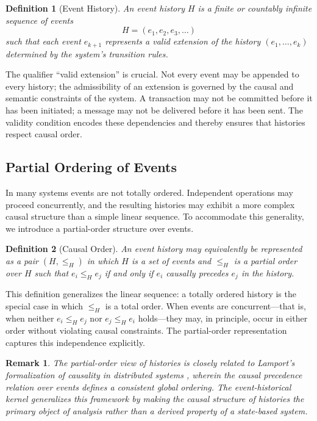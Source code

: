 \documentclass[12pt]{article}
\newtheorem{definition}{Definition}
\newtheorem{remark}{Remark}
\begin{document}
\begin{definition}[Event History]
An \emph{event history} $H$ is a finite or countably infinite sequence of events
\[
H = (e_1, e_2, e_3, \ldots)
\]
such that each event $e_{k+1}$ represents a valid extension of the history $(e_1, \ldots, e_k)$ determined by the system's transition rules.
\end{definition}

The qualifier ``valid extension'' is crucial. Not every event may be appended to every history; the admissibility of an extension is governed by the causal and semantic constraints of the system. A transaction may not be committed before it has been initiated; a message may not be delivered before it has been sent. The validity condition encodes these dependencies and thereby ensures that histories respect causal order.

\subsection{Partial Ordering of Events}

In many systems events are not totally ordered. Independent operations may proceed concurrently, and the resulting histories may exhibit a more complex causal structure than a simple linear sequence. To accommodate this generality, we introduce a partial-order structure over events.

\begin{definition}[Causal Order]
An \emph{event history} may equivalently be represented as a pair $(H, \leq_H)$ in which $H$ is a set of events and $\leq_H$ is a partial order over $H$ such that $e_i \leq_H e_j$ if and only if $e_i$ causally precedes $e_j$ in the history.
\end{definition}

This definition generalizes the linear sequence: a totally ordered history is the special case in which $\leq_H$ is a total order. When events are concurrent---that is, when neither $e_i \leq_H e_j$ nor $e_j \leq_H e_i$ holds---they may, in principle, occur in either order without violating causal constraints. The partial-order representation captures this independence explicitly.

\begin{remark}
The partial-order view of histories is closely related to Lamport's formalization of causality in distributed systems \cite{lamport1978}, wherein the causal precedence relation over events defines a consistent global ordering. The event-historical kernel generalizes this framework by making the causal structure of histories the primary object of analysis rather than a derived property of a state-based system.
\end{remark}
\end{document}
